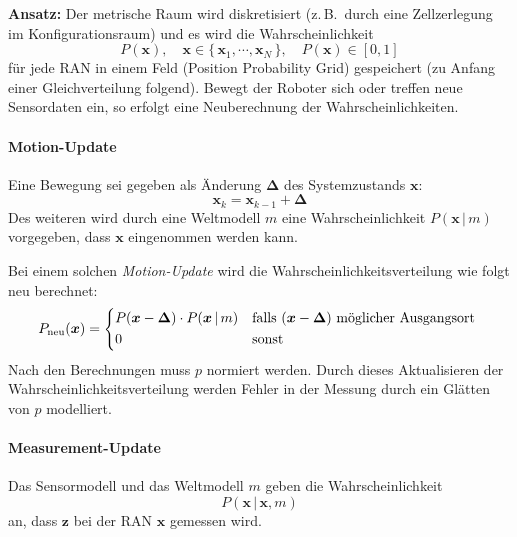 \documentclass[a4paper, 11pt, accentcolor = tud3b]{tudreport}
\newcommand{\given}{\,\vert\,}
\renewcommand{\vec}[1]{\boldsymbol{#1}}
\newcommand{\zB}{z.\,B.~}
\begin{document}
					\textbf{Ansatz:} Der metrische Raum wird diskretisiert (\zB durch eine Zellzerlegung im Konfigurationsraum) und es wird die Wahrscheinlichkeit
					\begin{equation*}
						P(\vec{x}),\quad \vec{x} \in \{\, \vec{x}_1, \cdots, \vec{x}_N \,\},\quad P(\vec{x}) \in [0, 1]
					\end{equation*}
					für jede RAN in einem Feld (Position Probability Grid) gespeichert (zu Anfang einer Gleichverteilung folgend). Bewegt der Roboter sich oder treffen neue Sensordaten ein, so erfolgt eine Neuberechnung der Wahrscheinlichkeiten.
					
					\paragraph{Motion-Update}
						Eine Bewegung sei gegeben als Änderung \( \vec{\Delta} \) des Systemzustands \(\vec{x}\):
						\begin{equation*}
							\vec{x}_k = \vec{x}_{k - 1} + \vec{\Delta}
						\end{equation*}
						Des weiteren wird durch eine Weltmodell \(m\) eine Wahrscheinlichkeit \( P(\vec{x} \given m) \) vorgegeben, dass \(\vec{x}\) eingenommen werden kann.
						
						Bei einem solchen \emph{Motion-Update} wird die Wahrscheinlichkeitsverteilung wie folgt neu berechnet:
						\begin{equation*}
							P_\text{neu}(\vec{x}) =
								\begin{cases*}
									P(\vec{x} - \vec{\Delta}) \cdot P(\vec{x} \given m) & falls \( (\vec{x} - \vec{\Delta}) \) möglicher Ausgangsort \\
									0 & sonst
								\end{cases*}
						\end{equation*}
						Nach den Berechnungen muss \(p\) normiert werden. Durch dieses Aktualisieren der Wahrscheinlichkeitsverteilung werden Fehler in der Messung durch ein Glätten von \( p \) modelliert.
					
					\paragraph{Measurement-Update}
						Das Sensormodell und das Weltmodell \(m\) geben die Wahrscheinlichkeit
						\begin{equation*}
							P(\vec{x} \given \vec{x}, m)
						\end{equation*}
						an, dass \( \vec{z} \) bei der RAN \( \vec{x} \) gemessen wird.
						
\end{document}
